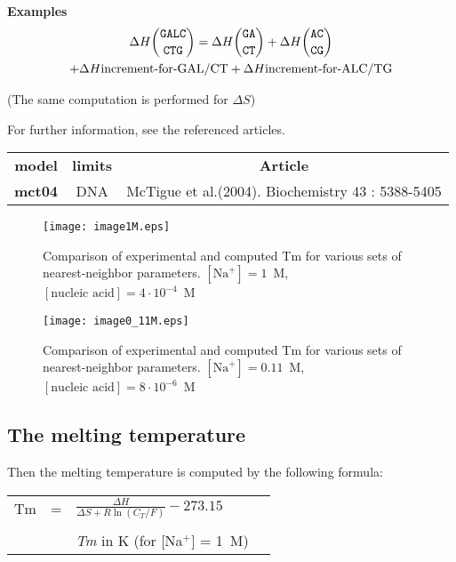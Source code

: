 \documentclass{article}
\begin{document}
\textbf{Examples}
\begin{multline*}
\Delta H {\mbox{\texttt{GALC}} \choose \mbox{\texttt{CTG}}} = 
\Delta H {\mbox{\texttt{GA}} \choose \mbox{\texttt{CT}}} +
\Delta H {\mbox{\texttt{AC}} \choose \mbox{\texttt{CG}}} \\ +
\Delta H {\mbox{increment-for-GAL/CT}} +
\Delta H {\mbox{increment-for-ALC/TG}}\\
\end{multline*}

       (The same computation is performed for $\Delta S$) 
       
For further information, see the referenced articles.

\begin{table}[h]
\begin{tabular}[h]{| c | c | c}
\textbf{model} & \textbf{limits} & \textbf{Article} \\
\textbf{mct04} & DNA & McTigue et al.(2004). Biochemistry 43 : 5388-5405\\
\end{tabular}
\end{table}
      

\begin{figure}[h]
\texttt{[image: image1M.eps]}
\caption{Comparison of experimental and computed Tm for various sets of
  nearest-neighbor parameters. $[\mbox{Na}^+] = 1$~M, $[\mbox{nucleic acid}] = 4\cdot{}10^{-4}$~M}
\end{figure}

\begin{figure}[h]
\texttt{[image: image0\_11M.eps]}
\caption{Comparison of experimental and computed Tm for various sets of
  nearest-neighbor parameters. $[\mbox{Na}^+] = 0.11$~M, $[\mbox{nucleic acid}] = 8\cdot{}10^{-6}$~M}
\end{figure}

\subsection{The melting temperature }  

Then the melting temperature is computed by the following formula: 
 
 

\begin{tabular}[h]{rcp{1.6in}p{2.2in}}
Tm & = & \begin{math} \frac{\Delta{}H}{\Delta{}S + R \ln (C_T/F)} - 273.15 \end{math} \\
   &   &                                                                                                                                                \\
   &   & \footnotesize \textit{Tm} in K (for [Na$^+$] = 1~M)
\end{tabular}
\end{document}
